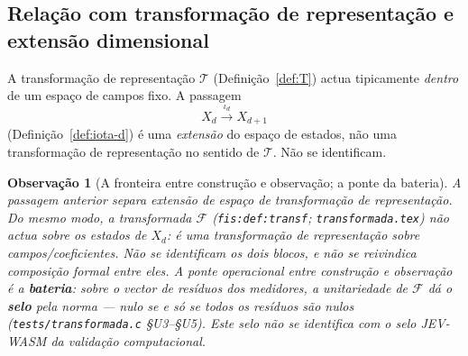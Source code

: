 \documentclass[11pt,a4paper]{article}
\newtheorem{observacao}{Observação}
\newcommand{\code}[1]{\texttt{\small #1}}
\begin{document}
\subsection{Relação com transformação de representação e extensão dimensional}

A transformação de representação \(\mathcal T\) (Definição~\ref{def:T}) actua tipicamente \emph{dentro} de um espaço de campos fixo. A passagem
\[
X_d\xrightarrow{\iota_d}X_{d+1}
\]
(Definição~\ref{def:iota-d}) é uma \emph{extensão} do espaço de estados, não uma transformação de representação no sentido de \(\mathcal T\). Não se identificam.

\begin{observacao}[A fronteira entre construção e observação; a ponte da bateria]
\label{obs:ponte-bateria}
A passagem anterior separa extensão de espaço de transformação de representação. Do mesmo modo, a transformada \(\mathcal F\) (\code{fis:def:transf}; \texttt{transformada.tex}) não actua sobre os estados de \(X_d\): é uma transformação de representação sobre campos/coeficientes. Não se identificam os dois blocos, e não se reivindica composição formal entre eles. A ponte operacional entre construção e observação é a \textbf{bateria}: sobre o vector de resíduos dos medidores, a unitariedade de \(\mathcal F\) dá o \textbf{selo} pela norma --- nulo se e só se todos os resíduos são nulos (\texttt{tests/transformada.c} §U3--§U5). Este selo não se identifica com o selo JEV-WASM da validação computacional.
\end{observacao}
\end{document}

